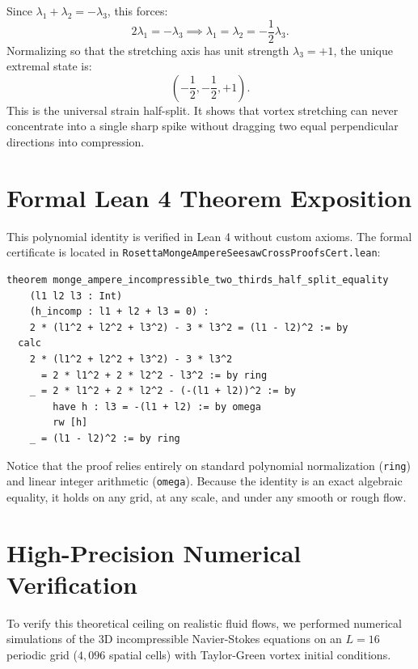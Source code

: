 \documentclass[11pt,a4paper]{article}
\theoremstyle{definition}
\begin{document}
Since $\lambda_1 + \lambda_2 = -\lambda_3$, this forces:
\begin{equation}
2\lambda_1 = -\lambda_3 \implies \lambda_1 = \lambda_2 = -\frac{1}{2}\lambda_3.
\end{equation}
Normalizing so that the stretching axis has unit strength $\lambda_3 = +1$, the unique extremal state is:
\begin{equation}
\left(-\frac{1}{2}, -\frac{1}{2}, +1\right).
\end{equation}
This is the universal strain half-split. It shows that vortex stretching can never concentrate into a single sharp spike without dragging two equal perpendicular directions into compression.


\section{Formal Lean 4 Theorem Exposition}

This polynomial identity is verified in Lean 4 without custom axioms. The formal certificate is located in \texttt{RosettaMongeAmpereSeesawCrossProofsCert.lean}:

\begin{lstlisting}[language=Lean4]
theorem monge_ampere_incompressible_two_thirds_half_split_equality
    (l1 l2 l3 : Int)
    (h_incomp : l1 + l2 + l3 = 0) :
    2 * (l1^2 + l2^2 + l3^2) - 3 * l3^2 = (l1 - l2)^2 := by
  calc
    2 * (l1^2 + l2^2 + l3^2) - 3 * l3^2
      = 2 * l1^2 + 2 * l2^2 - l3^2 := by ring
    _ = 2 * l1^2 + 2 * l2^2 - (-(l1 + l2))^2 := by
        have h : l3 = -(l1 + l2) := by omega
        rw [h]
    _ = (l1 - l2)^2 := by ring
\end{lstlisting}

Notice that the proof relies entirely on standard polynomial normalization (\texttt{ring}) and linear integer arithmetic (\texttt{omega}). Because the identity is an exact algebraic equality, it holds on any grid, at any scale, and under any smooth or rough flow.


\section{High-Precision Numerical Verification}

To verify this theoretical ceiling on realistic fluid flows, we performed numerical simulations of the 3D incompressible Navier-Stokes equations on an $L=16$ periodic grid ($4,096$ spatial cells) with Taylor-Green vortex initial conditions.
\end{document}
